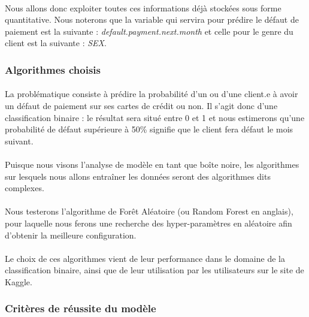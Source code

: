\documentclass[10pt, french, a4paper]{report}
\begin{document}
\paragraph{}
Nous allons donc exploiter toutes ces informations déjà stockées sous forme quantitative. Nous noterons que la variable qui servira pour prédire le défaut de paiement est la suivante : \textit{default.payment.next.month} et celle pour le genre du client est la suivante : \textit{SEX}.

\subsubsection{Algorithmes choisis}

\paragraph{}
La problématique consiste à prédire la probabilité d'un ou d'une client.e à avoir un défaut de paiement sur ses cartes de crédit ou non. Il s'agit donc d'une classification binaire : le résultat sera situé entre 0 et 1 et nous estimerons qu'une probabilité de défaut supérieure à 50\% signifie que le client fera défaut le mois suivant.

\paragraph{}
Puisque nous visons l'analyse de modèle en tant que boîte noire, les algorithmes sur lesquels nous allons entraîner les données seront des algorithmes dits complexes.

\paragraph{}
Nous testerons l'algorithme de Forêt Aléatoire (ou Random Forest en anglais), pour laquelle nous ferons une recherche des hyper-paramètres en aléatoire afin d'obtenir la meilleure configuration.

\paragraph{}
Le choix de ces algorithmes vient de leur performance dans le domaine de la classification binaire, ainsi que de leur utilisation par les utilisateurs sur le site de Kaggle. 

\subsubsection{Critères de réussite du modèle}
\end{document}
